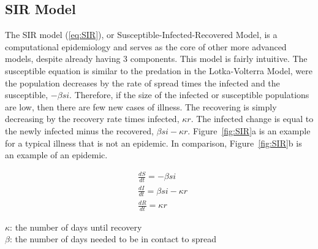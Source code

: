 \documentclass[12pt, letterpaper]{article}
\begin{document}
\subsection{SIR Model} \label{sir}

The SIR model (\ref{eq:SIR}), or Susceptible-Infected-Recovered Model, is a computational epidemiology and
serves as the core of other more advanced models, despite already having 3 components. This model is
fairly intuitive. The susceptible equation is similar to the predation in the Lotka-Volterra Model, were the
population decreases by the rate of spread times the infected and the susceptible, $- \beta s i$. 
Therefore, if the size of the infected or susceptible populations are low, then there are few new cases of 
illness. The recovering is simply decreasing by the recovery rate times infected, $\kappa r$.  The
infected change is equal to the newly infected minus the recovered, $\beta s i - \kappa r$. 
Figure~\ref{fig:SIR}a is an example for a typical illness that is not an epidemic. In comparison, Figure~\ref{fig:SIR}b is an example of an epidemic.

\begin{singlespace}
  \begin{equation}\label{eq:SIR}
    \begin{split}
      &\frac{dS}{dt} = -\beta s i \\
      &\frac{dI}{dt} = \beta s i - \kappa r \\
      &\frac{dR}{dt} = \kappa r
    \end{split}
  \end{equation}
  \begin{small}
$\kappa$: the number of days until recovery \\
$\beta$: the number of days needed to be in contact to spread
  \end{small}
\end{singlespace}
\end{document}
